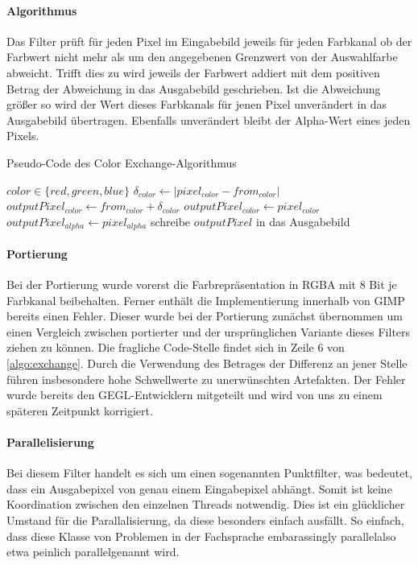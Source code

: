 \documentclass[10pt,a4paper]{article}
\providecommand{\abs}[1]{\lvert#1\rvert}
\begin{document}
\paragraph{Algorithmus} 

Das Filter prüft für jeden Pixel im Eingabebild jeweils für jeden Farbkanal ob der Farbwert nicht mehr als um den angegebenen Grenzwert von der Auswahlfarbe abweicht. Trifft dies zu wird jeweils der Farbwert addiert mit dem positiven Betrag der Abweichung in das Ausgabebild geschrieben. Ist die Abweichung größer so wird der Wert dieses Farbkanals für jenen Pixel unverändert in das Ausgabebild übertragen. Ebenfalls unverändert bleibt der Alpha-Wert eines jeden Pixels.

\begin{algorithm}[H]
\caption{Pseudo-Code des \glqq Color Exchange\grqq-Algorithmus}
\label{algo:exchange}
\begin{algorithmic}[1]
\State $color \in \{red, green, blue\}$
  \State $\delta_{color} \gets \abs{ pixel_{color} - from_{color}}$    
      \State $outputPixel_{color} \gets from_{color} + \delta_{color}$
    \EndFor
  \Else
      \State $outputPixel_{color} \gets pixel_{color}$
    \EndFor
  \EndIf
  \State $outputPixel_{alpha} \gets pixel_{alpha}$
  \State schreibe $outputPixel$ in das Ausgabebild
\EndFor
\end{algorithmic}
\end{algorithm}

\paragraph{Portierung}
Bei der Portierung wurde vorerst die Farbrepräsentation in RGBA mit 8 Bit je Farbkanal beibehalten. Ferner enthält die Implementierung innerhalb von GIMP bereits einen Fehler. Dieser wurde bei der Portierung zunächst übernommen um einen Vergleich zwischen portierter und der ursprünglichen Variante dieses Filters ziehen zu können. Die fragliche Code-Stelle findet sich in Zeile 6 von \autoref{algo:exchange}. Durch die Verwendung des Betrages der Differenz an jener Stelle führen insbesondere hohe Schwellwerte zu unerwünschten Artefakten. Der Fehler wurde bereits den GEGL-Entwicklern mitgeteilt und wird von uns zu einem späteren Zeitpunkt korrigiert.

\paragraph{Parallelisierung}
Bei diesem Filter handelt es sich um einen sogenannten Punktfilter, was bedeutet, dass ein Ausgabepixel von genau einem Eingabepixel abhängt. Somit ist keine Koordination zwischen den einzelnen Threads notwendig. Dies ist ein glücklicher Umstand für die Parallalisierung, da diese besonders einfach ausfällt. So einfach, dass diese Klasse von Problemen in der Fachsprache \glqq embarassingly parallel\grqq also etwa \glqq peinlich parallel\grqq genannt wird.
\end{document}
